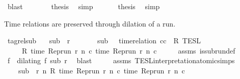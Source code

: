 \begin{isabellebody}
\ blast\isanewline
\ \ \ \ \isacommand{{\isacharbraceright}}\isamarkupfalse%
\ \isamarkupfalse%
\ {\isacharquery}thesis\ \isamarkupfalse%
\ simp\isanewline
\ \ \isamarkupfalse%
\isanewline
\ \ \isamarkupfalse%
\ {\isacharquery}thesis\ \isamarkupfalse%
\ simp\isanewline
{}\isamarkupfalse%
%
\endisatagproof
{\isafoldproof}%
%
\isadelimproof
%
\endisadelimproof
%
\begin{isamarkuptext}%
Time relations are preserved through dilation of a run.%
\end{isamarkuptext}\isamarkuptrue%
\isamarkupfalse%
\ tagrel{\isacharunderscore}sub{\isacharprime}{\isacharcolon}\isanewline
\ \ \ {\isacartoucheopen}sub\ {\isasymlless}\ r{\isacartoucheclose}\isanewline
\ \ \ \ \ \ \ {\isacartoucheopen}sub\ {\isasymin}\ {\isasymlbrakk}\ time{\isacharminus}relation\ {\isasymlfloor}cc\ {\isasymin}\ R\ {\isasymrbrakk}\isactrlsub T\isactrlsub E\isactrlsub S\isactrlsub L{\isacartoucheclose}\isanewline
\ \ \ \ \ {\isacartoucheopen}R\ {\isacharparenleft}time\ {\isacharparenleft}{\isacharparenleft}Rep{\isacharunderscore}run\ r{\isacharparenright}\ n\ c\ time\ {\isacharparenleft}{\isacharparenleft}Rep{\isacharunderscore}run\ r{\isacharparenright}\ n\ c\isanewline
%
\isadelimproof
%
\endisadelimproof
%
\isatagproof
{}\isamarkupfalse%
\ {\isacharminus}\isanewline
\ \ \isamarkupfalse%
\ assms{\isacharparenleft}{}{\isacharparenright}\ is{\isacharunderscore}subrun{\isacharunderscore}def\ \isamarkupfalse%
\ f\ \ {\isacharasterisk}{\isacharcolon}{\isacartoucheopen}dilating\ f\ sub\ r{\isacartoucheclose}\ \isamarkupfalse%
\ blast\isanewline
\ \ \isamarkupfalse%
\ \isamarkupfalse%
\ assms{\isacharparenleft}{}{\isacharparenright}\ TESL{\isacharunderscore}interpretation{\isacharunderscore}atomic{\isachardot}simps{\isacharparenleft}{}{\isacharparenright}\ \isamarkupfalse%
\isanewline
\ \ \ \ {\isacartoucheopen}sub\ {\isasymin}\ {\isacharbraceleft}r{\isachardot}\ {\isasymforall}n{\isachardot}\ R\ {\isacharparenleft}time\ {\isacharparenleft}{\isacharparenleft}Rep{\isacharunderscore}run\ r{\isacharparenright}\ n\ c\ time\ {\isacharparenleft}{\isacharparenleft}Rep{\isacharunderscore}run\ r{\isacharparenright}\ n\ c\ \isamarkupfalse%

\end{isabellebody}
